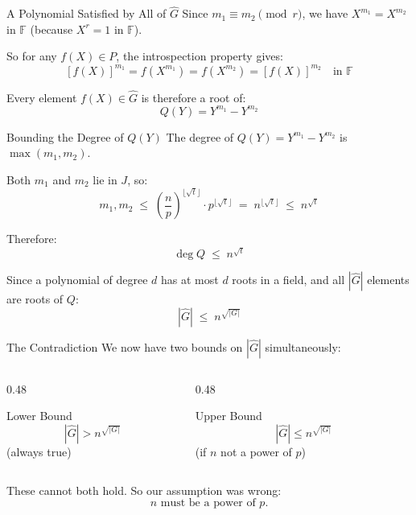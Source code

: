 \documentclass{beamer}
\begin{document}

\begin{frame}{A Polynomial Satisfied by All of $\hat{G}$}
Since $m_1 \equiv m_2 \pmod{r}$, we have $X^{m_1} = X^{m_2}$ in $\mathbb{F}$
(because $X^r = 1$ in $\mathbb{F}$).

So for any $f(X) \in P$, the introspection property gives:
\[
    [f(X)]^{m_1} = f(X^{m_1}) = f(X^{m_2}) = [f(X)]^{m_2} \quad \text{in } \mathbb{F}
\]

Every element $f(X) \in \hat{G}$ is therefore a root of:
\[
    Q(Y) = Y^{m_1} - Y^{m_2}
\]
\end{frame}


\begin{frame}{Bounding the Degree of $Q(Y)$}
The degree of $Q(Y) = Y^{m_1} - Y^{m_2}$ is $\max(m_1, m_2)$.

Both $m_1$ and $m_2$ lie in $J$, so:
\[
    m_1, m_2 \;\le\; \left(\frac{n}{p}\right)^{\lfloor\sqrt{t}\rfloor} \cdot p^{\lfloor\sqrt{t}\rfloor}
    \;=\; n^{\lfloor\sqrt{t}\rfloor} \;\le\; n^{\sqrt{t}}
\]

Therefore:
\[
    \deg Q \;\le\; n^{\sqrt{t}}
\]

Since a polynomial of degree $d$ has at most $d$ roots in a field,
and all $|\hat{G}|$ elements are roots of $Q$:
\[
    \boxed{|\hat{G}| \;\le\; n^{\sqrt{|G|}}}
\]
\end{frame}


\begin{frame}{The Contradiction}
We now have two bounds on $|\hat{G}|$ simultaneously:

\begin{columns}
\begin{column}{0.48\textwidth}
\begin{block}{Lower Bound}
\[
|\hat{G}| > n^{\sqrt{|G|}}
\]
(always true)
\end{block}
\end{column}
\begin{column}{0.48\textwidth}
\begin{block}{Upper Bound}
\[
|\hat{G}| \le n^{\sqrt{|G|}}
\]
(if $n$ not a power of $p$)
\end{block}
\end{column}
\end{columns}
\vspace{1.5em}

These cannot both hold. So our assumption was wrong:
\[
    n \text{ must be a power of } p.
\]
\end{frame}
\end{document}
